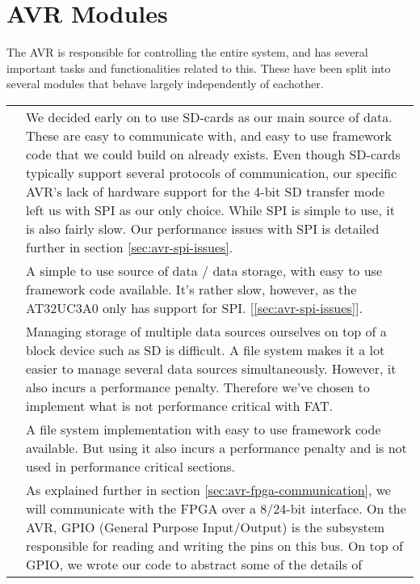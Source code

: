 \section{AVR Modules}


The AVR is responsible for controlling the entire system, and has several
important tasks and functionalities related to this. These have been split
into several modules that behave largely independently of eachother.

\begin{table}[htbp]
\centering
\begin{tabular}{l|p{10cm}}
\begin{comment}
	SD over SPI & We decided early on to use SD-cards as our main source of data. These
	are easy to communicate with, and easy to use framework code that we
	could build on already exists.
	Even though SD-cards typically support several protocols of
	communication, our specific AVR's lack of hardware support for the 4-bit
	SD transfer mode left us with SPI as our only choice. While SPI is
	simple to use, it is also fairly slow. Our performance issues with SPI
	is detailed further in section \ref{sec:avr-spi-issues}. \\
\end{comment}
	SD over SPI & A simple to use source of data / data storage, with easy to use
	framework code available. It's rather slow, however, as the AT32UC3A0 only has
	support for SPI. [\ref{sec:avr-spi-issues}]. \\
	\hline
\begin{comment}
	FAT & Managing storage of multiple data sources ourselves on top of a block
	device such as SD is difficult. A file system makes it a lot easier
	to manage several data sources simultaneously. However, it also incurs a
	performance penalty. Therefore we've chosen to implement what is not performance
	critical with FAT. \\
\end{comment}
	FAT & A file system implementation with easy to use framework code available. But
	using it also incurs a performance penalty and is not used in performance critical
	sections. \\
	\hline
\begin{comment}
	FPGA/GPIO & As explained further in section \ref{sec:avr-fpga-communication}, we
	will communicate with the FPGA over a 8/24-bit interface. On the AVR,
	GPIO (General Purpose Input/Output) is the subsystem responsible for
	reading and writing the pins on this bus.
	On top of GPIO, we wrote our code to abstract some of the details of

\end{comment}
\end{tabular}
\end{table}
